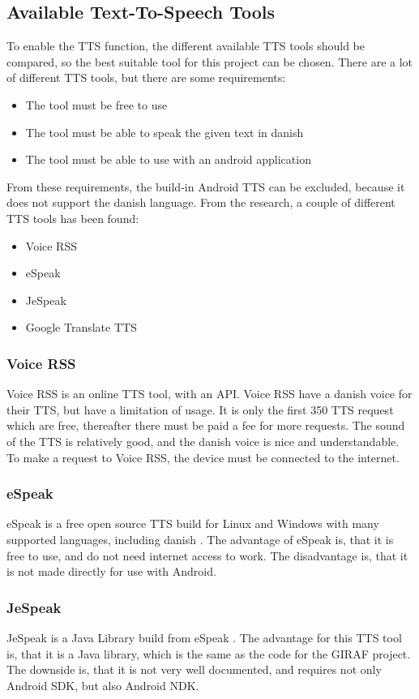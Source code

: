 \subsection{Available Text-To-Speech Tools}
\label{sec:ttstool}
To enable the TTS function, the different available TTS tools should be compared, so the best suitable tool for this project can be chosen.
There are a lot of different TTS tools, but there are some requirements:
\begin{itemize}
	\item The tool must be free to use
	\item The tool must be able to speak the given text in danish
	\item The tool must be able to use with an android application
\end{itemize}
From these requirements, the build-in Android TTS can be excluded, because it does not support the danish language.
From the research, a couple of different TTS tools has been found:
\begin{itemize}
	\item Voice RSS
	\item eSpeak
	\item JeSpeak
	\item Google Translate TTS
\end{itemize}

\subsubsection{Voice RSS}
Voice RSS \citep{voicerss} is an online TTS tool, with an API. Voice RSS have a danish voice for their TTS, but have a limitation of usage. It is only the first 350 TTS request which are free, thereafter there must be paid a fee for more requests. The sound of the TTS is relatively good, and the danish voice is nice and understandable. To make a request to Voice RSS, the device must be connected to the internet.

\subsubsection{eSpeak}
eSpeak is a free open source TTS build for Linux and Windows with many supported languages, including danish \citep{espeak}. The advantage of eSpeak is, that it is free to use, and do not need internet access to work. The disadvantage is, that it is not made directly for use with Android. 

\subsubsection{JeSpeak}
JeSpeak is a Java Library build from eSpeak \citep{jespeak}. The advantage for this TTS tool is, that it is a Java library, which is the same as the code for the GIRAF project. The downside is, that it is not very well documented, and requires not only Android SDK, but also Android NDK.


